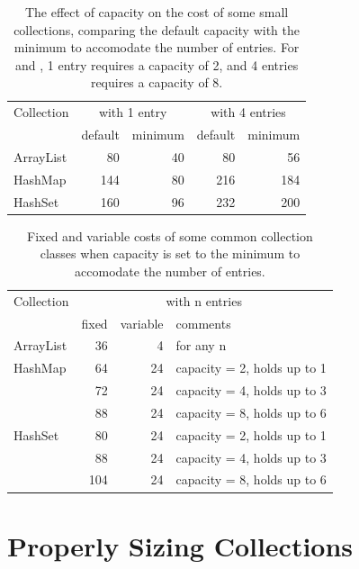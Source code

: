 \begin{table}
\centering
 		\begin{tabular}{l||rr||rr}
 		\toprule
	 	 Collection & \multicolumn{2}{c}{with 1 entry} & \multicolumn{2}{c}{with 4 entries}\\
	 	 & default & minimum & default & minimum \\
	 	 \midrule
	 	ArrayList & 80 & 40 & 80 & 56 \\
 		HashMap & 144 & 80 & 216 & 184 \\
  		HashSet & 160 & 96 & 232 & 200 \\
 	 	\bottomrule
 	 	\end{tabular}
	\caption{The effect of capacity on the cost of some small collections,
	comparing the default capacity with the minimum to accomodate the number of entries.
	For  and , 1 entry requires a capacity of 2, and 4 entries requires a capacity
	of 8.}
	\label{tab:small-collections-minimum-samples}
\end{table}

\begin{table}
\centering
 		\begin{tabular}{l||rrl}
 		\toprule
	 	 Collection & \multicolumn{3}{c}{with n entries}\\
	 	 & fixed & variable & comments \\
	 	 \midrule
	 	ArrayList & 36 \footnotemark[1] & 4 & for any n \\
	 	\midrule
 		HashMap &  64 & 24 & capacity = 2, holds up to 1 \\
 		        &  72 & 24 & capacity = 4, holds up to 3 \\
 		        &  88 & 24 & capacity = 8, holds up to 6 \\
 		\midrule
 		HashSet &  80 & 24 & capacity = 2, holds up to 1\\
 		        &  88 & 24 & capacity = 4, holds up to 3 \\
		        &  104 & 24 & capacity = 8, holds up to 6 \\
	 	\bottomrule
 	 	\end{tabular}
	\caption{Fixed and variable costs of some common collection classes when capacity is set
	to the minimum to accomodate the number of entries.}
	\label{tab:small-collections-minimum-fixed-var}
\end{table}


\section{Properly Sizing Collections}
\label{sec:proper-size}

